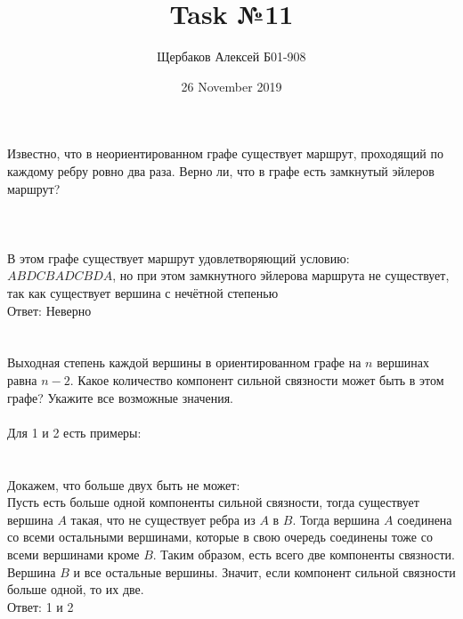 \documentclass{article}
\title{Task №11}
\author{Щербаков Алексей Б01-908}
\date{26 November 2019}
\begin{document}
\maketitle
\section{}
Известно, что в неориентированном графе существует маршрут, проходящий по каждому ребру ровно два раза. Верно ли, что в графе есть замкнутый эйлеров маршрут?\\\\
\\\\
В этом графе существует маршрут удовлетворяющий условию: $ABDCBADCBDA$, но при этом замкнутного эйлерова маршрута не существует, так как существует вершина с нечётной степенью\\
Ответ: Неверно
\section{}
Выходная степень каждой вершины в ориентированном графе на $n$ вершинах равна $n-2$. Какое количество компонент сильной связности может быть в этом графе? Укажите все возможные значения.\\\\
Для 1 и 2 есть примеры:\\
\\\\
Докажем, что больше двух быть не может:\\
Пусть есть больше одной компоненты сильной связности, тогда существует вершина $A$ такая, что не существует ребра из $A$ в $B$. Тогда вершина $A$ соединена со всеми остальными вершинами, которые в свою очередь соединены тоже со всеми вершинами кроме $B$. Таким образом, есть всего две компоненты связности. Вершина $B$ и все остальные вершины. Значит, если компонент сильной связности больше одной, то их две.
\\
Ответ: 1 и 2
\end{document}
